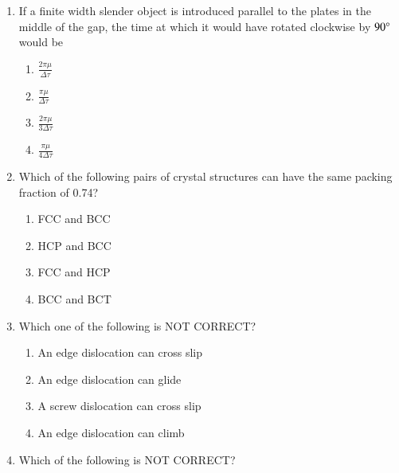\documentclass[journal]{IEEEtran}
\begin{document}
\begin{enumerate}
    \item If a finite width slender object is introduced parallel to the plates in the middle of the gap, the time at which it would have rotated clockwise by $90\degree$ would be
    
	\begin{multicols}{4}
		\begin{enumerate}
                \item $\frac{2\pi\mu}{\Delta\tau}$
                \item $\frac{\pi\mu}{\Delta\tau}$
                \item $\frac{2\pi\mu}{3\Delta\tau}$
                \item $\frac{\pi\mu}{4\Delta\tau}$
			\end{enumerate}
		\end{multicols}

    \item Which of the following pairs of crystal structures can have the same packing fraction of 0.74?

    \begin{multicols}{4}
       \begin{enumerate}
            \item FCC and BCC
            \item HCP and BCC
            \item FCC and HCP
            \item BCC and BCT
        \end{enumerate}
    \end{multicols}
  
    \item Which one of the following is NOT CORRECT?

    \begin{multicols}{2}
        \begin{enumerate}
            \item An edge dislocation can cross slip
            \item An edge dislocation can glide
            \item A screw dislocation can cross slip
            \item An edge dislocation can climb
        \end{enumerate}
    \end{multicols}

    \item Which of the following is NOT CORRECT?



\end{enumerate}
\end{document}
